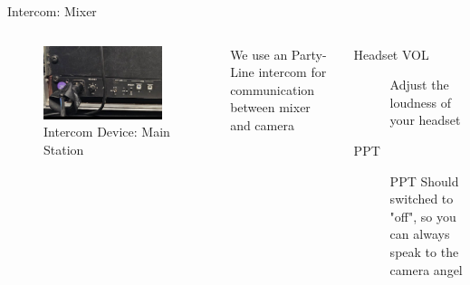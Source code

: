 \documentclass[aspectratio=169]{beamer}
\begin{document}
\begin{frame}{Intercom: Mixer }
	\begin{columns}[T,onlytextwidth]
		\begin{figure} 
			\centering
			\includegraphics[width=0.9\textwidth]{images/intercom-Mixer.png}
			\caption{Intercom Device: Main Station}
		\end{figure}
			We use an Party-Line intercom for communication between mixer and camera
		\begin{description}
			\item[Headset VOL] Adjust the loudness of your headset
			\item[PPT] PPT Should switched to "off", so you can always speak to the camera angel
		\end{description}
	\end{columns}
\end{frame}
\end{document}
